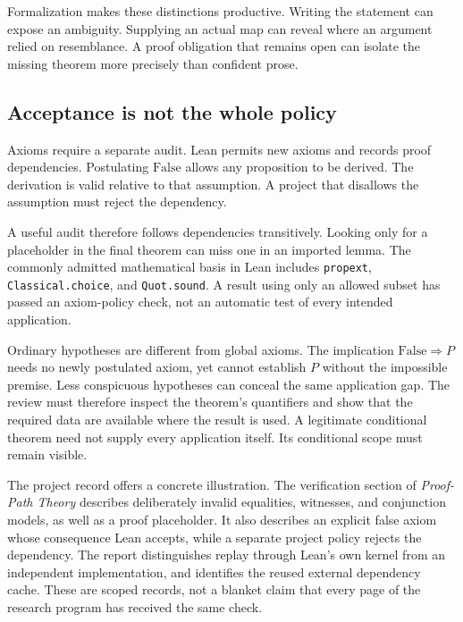 Formalization makes these distinctions productive. Writing the statement can expose an ambiguity. Supplying an actual map can reveal where an argument relied on resemblance. A proof obligation that remains open can isolate the missing theorem more precisely than confident prose.

\subsection{Acceptance is not the whole policy}

Axioms require a separate audit. Lean permits new axioms and records proof dependencies. Postulating \(\mathrm{False}\) allows any proposition to be derived. The derivation is valid relative to that assumption. A project that disallows the assumption must reject the dependency.

A useful audit therefore follows dependencies transitively. Looking only for a placeholder in the final theorem can miss one in an imported lemma. The commonly admitted mathematical basis in Lean includes \texttt{propext}, \texttt{Classical.choice}, and \texttt{Quot.sound}. A result using only an allowed subset has passed an axiom-policy check, not an automatic test of every intended application.

Ordinary hypotheses are different from global axioms. The implication \(\mathrm{False}\Rightarrow P\) needs no newly postulated axiom, yet cannot establish \(P\) without the impossible premise. Less conspicuous hypotheses can conceal the same application gap. The review must therefore inspect the theorem's quantifiers and show that the required data are available where the result is used. A legitimate conditional theorem need not supply every application itself. Its conditional scope must remain visible.

The project record offers a concrete illustration. The verification section of \emph{Proof-Path Theory} describes deliberately invalid equalities, witnesses, and conjunction models, as well as a proof placeholder. It also describes an explicit false axiom whose consequence Lean accepts, while a separate project policy rejects the dependency. The report distinguishes replay through Lean's own kernel from an independent implementation, and identifies the reused external dependency cache. These are scoped records, not a blanket claim that every page of the research program has received the same check.

